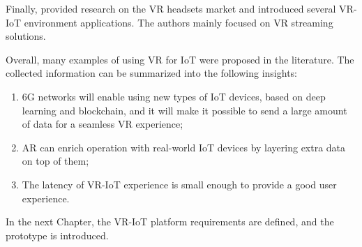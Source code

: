 Finally, \cite{hu_virtual_2021} provided research on the VR headsets market and introduced several VR-IoT environment applications. The authors mainly focused on VR streaming solutions.

Overall, many examples of using VR for IoT were proposed in the literature. The collected information can be summarized into the following insights:
\begin{enumerate}
    \item 6G networks will enable using new types of IoT devices, based on deep learning and blockchain, and it will make it possible to send a large amount of data for a seamless VR experience;
    \item AR can enrich operation with real-world IoT devices by layering extra data on top of them;
    \item The latency of VR-IoT experience is small enough to provide a good user experience.
\end{enumerate}

In the next Chapter, the VR-IoT platform requirements are defined, and the prototype is introduced.